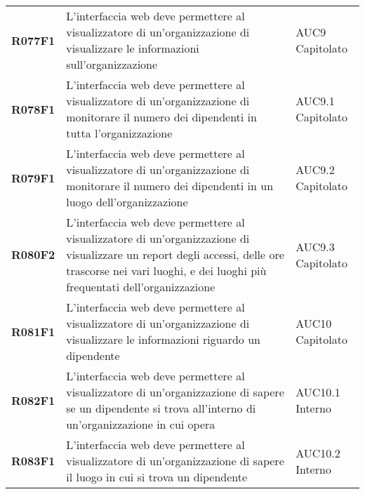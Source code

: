 \documentclass[../analisi-dei-requisiti.tex]{subfiles}
\begin{document}
\begin{longtable}[H]{>{\centering\bfseries}m{3cm} >{\centering}m{10cm} >{\centering\arraybackslash}m{3cm}}
  R077F1                               & L'interfaccia web deve permettere al visualizzatore di un'organizzazione di visualizzare le informazioni sull'organizzazione                                                                            & AUC9 Capitolato               \\
  R078F1                               & L'interfaccia web deve permettere al visualizzatore di un'organizzazione di monitorare il numero dei dipendenti in tutta l'organizzazione                                                               & AUC9.1 Capitolato             \\
  R079F1                               & L'interfaccia web deve permettere al visualizzatore di un'organizzazione di monitorare il numero dei dipendenti in un luogo dell'organizzazione                                                         & AUC9.2 Capitolato             \\
  R080F2                               & L'interfaccia web deve permettere al visualizzatore di un'organizzazione di visualizzare un report degli accessi, delle ore trascorse nei vari luoghi, e dei luoghi più frequentati dell'organizzazione & AUC9.3 Capitolato             \\
  R081F1                               & L'interfaccia web deve permettere al visualizzatore di un'organizzazione di visualizzare le informazioni riguardo un dipendente                                                                         & AUC10 Capitolato              \\
  R082F1                               & L'interfaccia web deve permettere al visualizzatore di un'organizzazione di sapere se un dipendente si trova all'interno di un'organizzazione in cui opera                                              & AUC10.1 Interno               \\
  R083F1                               & L'interfaccia web deve permettere al visualizzatore di un'organizzazione di sapere il luogo in cui si trova un dipendente                                                                               & AUC10.2 Interno               \\


\end{longtable}
\end{document}
